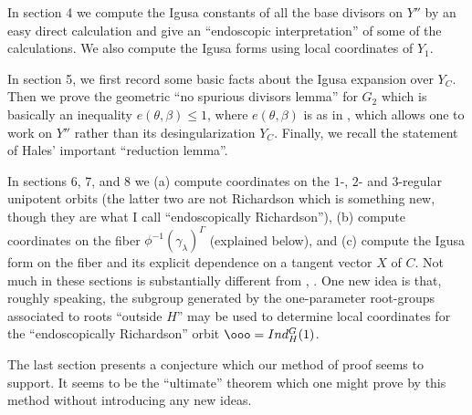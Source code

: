 In section 4 we compute the Igusa constants of all
the base divisors on $Y''$ by an easy direct calculation
and give an ``endoscopic interpretation'' of some of the
calculations.
We also compute the Igusa forms using local coordinates of $Y_1$.

In section 5, we first record some basic facts about
the Igusa expansion over $Y_C$. Then we
prove the geometric ``no spurious divisors lemma'' for $G_2$
which is basically an inequality $e(\theta,\beta)\leq 1$,
where $e(\theta,\beta)$ is as in \cite{L}, which allows one to work
on $Y''$ rather than its desingularization $Y_C$.
Finally, we recall the statement of Hales' important ``reduction lemma''.

In sections 6, 7, and 8
we (a) compute coordinates
on the $1$-, $2$- and $3$-regular unipotent orbits (the latter two
are not Richardson which is something new, though they are what I call
``endoscopically Richardson''), (b) compute
coordinates on the fiber $\phi^{-1}(\gamma_\lambda)^\Gamma$
(explained below), and (c) compute the Igusa form
on the fiber and its explicit dependence on a tangent vector $X$
of $C$. Not much in these 
sections is substantially different from \cite{H2}, \cite{H3}. One
new idea is that, roughly speaking, the subgroup generated by the
one-parameter root-groups associated to roots ``outside $H$'' 
may be used to determine local coordinates for the
``endoscopically Richardson'' orbit $\ooo=Ind_H^G(1)$.

The last section presents a conjecture which our method of proof
seems to support. It seems to be the ``ultimate'' theorem which one
might prove by this method without introducing any new ideas.

